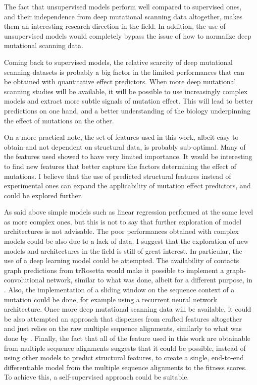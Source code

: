 The fact that unsupervised models perform well compared to supervised ones, and their independence from deep mutational scanning data altogether, makes them an interesting research direction in the field.
In addition, the use of unsupervised models would completely bypass the issue of how to normalize deep mutational scanning data.

Coming back to supervised models, the relative scarcity of deep mutational scanning datasets is probably a big factor in the limited performances that can be obtained with quantitative effect predictors.
When more deep mutational scanning studies will be available, it will be possible to use increasingly complex models and extract more subtle signals of mutation effect.
This will lead to better predictions on one hand, and a better understanding of the biology underpinning the effect of mutations on the other.

On a more practical note, the set of features used in this work, albeit easy to obtain and not dependent on structural data, is probably sub-optimal.
Many of the features used showed to have very limited importance.
It would be interesting to find new features that better capture the factors determining the effect of mutations.
I believe that the use of predicted structural features instead of experimental ones can expand the applicability of mutation effect predictors, and could be explored further.

As said above simple models such as linear regression performed at the same level as more complex ones, but this is not to say that further exploration of model architectures is not advisable.
The poor performances obtained with complex models could be also due to a lack of data.
I suggest that the exploration of new models and architectures in the field is still of great interest.
In particular, the use of a deep learning model could be attempted.
The availability of contacts graph predictions from trRosetta would make it possible to implement a graph-convolutional network, similar to what was done, albeit for a different purpose, in \textcite{Baldassarre2020}.
Also, the implementation of a sliding window on the sequence context of a mutation could be done, for example using a recurrent neural network architecture.
Once more deep mutational scanning data will be available, it could be also attempted an approach that dispenses from crafted features altogether and just relies on the raw multiple sequence alignments, similarly to what was done by \textcite{Mirabello2019}.
Finally, the fact that all of the feature used in this work are obtainable from multiple sequence alignments suggests that it could be possible, instead of using other models to predict structural features, to create a single, end-to-end differentiable model from the multiple sequence alignments to the fitness scores.
To achieve this, a self-supervised approach could be suitable.

